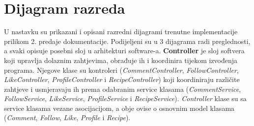 			\eject
			
			
		\section{Dijagram razreda}
	\noindent U nastavku su prikazani i opisani razredni dijagrami trenutne implementacije prilikom 2. predaje dokumentacije. Podijeljeni su u 3 dijagrama radi preglednosti, a svaki opisuje posebni sloj u arhitekturi software-a.
	\newline
	\newline		
\noindent\textbf{Controller} je sloj softvera koji upravlja dolaznim zahtjevima, obrađuje ih i koordinira tijekom izvođenja programa. Njegove klase su kontroleri (\textit{CommentController}, \textit{FollowController}, \textit{LikeController}, \textit{ProfileController} i \textit{RecipeController}) koji koordiniraju različite zahtjeve i usmjeravaju ih prema odabranim service klasama (\textit{CommentService}, \textit{FollowService}, \textit{LikeService}, \textit{ProfileService} i \textit{RecipeService}). \textit{Controller} klase su sa service klasama vezane asocijacijom, a obje ovise o osnovnim model klasama (\textit{Comment}, \textit{Follow}, \textit{Like}, \textit{Profile} i \textit{Recipe}).


